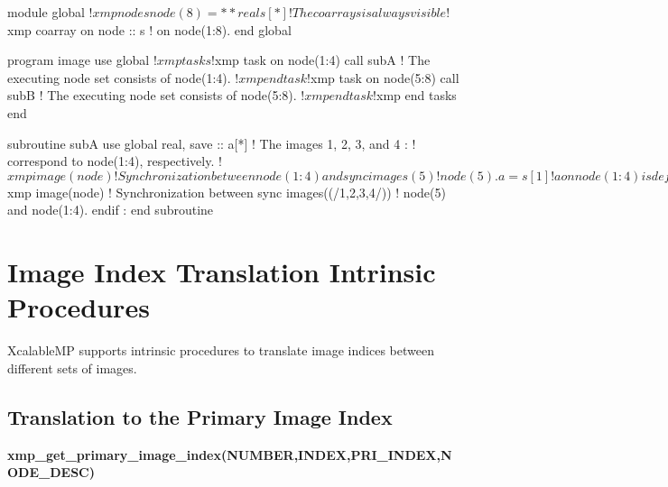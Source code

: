 \begin{XFexample}
      module global
!$xmp nodes node(8)=**
      real s[*]             ! The coarray s is always visible 
!$xmp coarray on node :: s  ! on node(1:8).
      end global

      program image
      use global
!$xmp tasks
!$xmp task on node(1:4) 
        call subA  ! The executing node set consists of node(1:4).
!$xmp end task
!$xmp task on node(5:8) 
        call subB  ! The executing node set consists of node(5:8).
!$xmp end task
!$xmp end tasks
      end

      subroutine subA      
      use global
      real, save :: a[*] ! The images 1, 2, 3, and 4 
         :               ! correspond to node(1:4), respectively.
!$xmp image(node)        ! Synchronization between node(1:4) and
        sync images(5)   ! node(5).
      a = s[1]           ! a on node(1:4) is defined using
         :               ! the value of s on node(1).
      end subroutine	

      subroutine subB 
      use global
      real, save :: b[*] ! The images 1, 2, 3, and 4 
         :               ! correspond to node(5:8), respectively.
      if(this_image() .eq. 1)then ! The image 1 indicates node(5).
        s[1] = b      ! s on node(1) is defined using the value of 
                      ! b on node(5).
!$xmp   image(node)                ! Synchronization between 
          sync images((/1,2,3,4/)) ! node(5) and node(1:4).
      endif
         :
      end subroutine		
\end{XFexample}


\section{Image Index Translation Intrinsic Procedures}

XcalableMP supports intrinsic procedures to translate
image indices between different sets of images.

\subsection{Translation to the Primary Image Index}

{\bf xmp\_get\_primary\_image\_index(NUMBER,INDEX,PRI\_INDEX,NODE\_DESC)}

